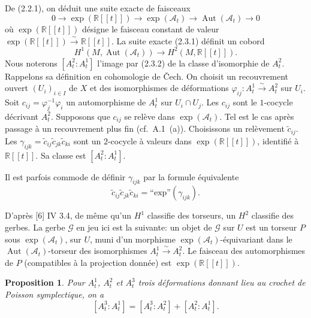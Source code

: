 \documentclass[11pt,a4paper]{article}
\theoremstyle{plain}
\newtheorem{proposition}[theorem]{Proposition}
\theoremstyle{definition}
\DeclareMathOperator{\Aut}{Aut}
\newcommand{\R}{\mathbb{R}}
\newcommand{\iso}{\xrightarrow{\sim}}
\begin{document}
\subsection{}
De (2.2.1), on d\'eduit une suite exacte de faisceaux
\begin{equation}
0 \longrightarrow \exp(\R[[t]]) \longrightarrow \exp(\mathcal{A}_{t}) \longrightarrow \Aut(\mathcal{A}_{t}) \longrightarrow 0 \tag{2.3.1}
\end{equation}
o\`u $\exp(\R[[t]])$ d\'esigne le faisceau constant de valeur $\exp(\R[[t]]) \iso \R[[t]]$. La suite exacte (2.3.1) d\'efinit un cobord
\begin{equation}
H^{1}(M, \Aut(\mathcal{A}_{t})) \longrightarrow H^{2}(M, \R[[t]]). \tag{2.3.2}
\end{equation}
Nous noterons $[A_{t}^{2} : A_{t}^{1}]$ l'image par (2.3.2) de la classe d'isomorphie de $A_{t}^{2}$. Rappelons sa d\'efinition en cohomologie de \v{C}ech. On choisit un recouvrement ouvert $(U_{i})_{i \in I}$ de $X$ et des isomorphismes de d\'eformations $\varphi_{ij}: A_{t}^{1} \iso A_{t}^{2}$ sur $U_{i}$. Soit $c_{ij} = \varphi_{j}^{-1} \varphi_{i}$ un automorphisme de $A_{t}^{1}$ sur $U_{i} \cap U_{j}$. Les $c_{ij}$ sont le $1$-cocycle d\'ecrivant $A_{t}^{2}$. Supposons que $c_{ij}$ se rel\`eve dans $\exp(\mathcal{A}_{t})$. Tel est le cas apr\`es passage \`a un recouvrement plus fin (cf.~A.1~(a)). Choisissons un rel\`evement $\tilde{c}_{ij}$. Les $\gamma_{ijk} = \tilde{c}_{ij} \tilde{c}_{jk} \tilde{c}_{ki}$ sont un $2$-cocycle \`a valeurs dans $\exp(\R[[t]])$, identifi\'e \`a $\R[[t]]$. Sa classe est $[A_{t}^{2} : A_{t}^{1}]$.

Il est parfois commode de d\'efinir $\gamma_{ijk}$ par la formule \'equivalente
\[
\tilde{c}_{ij} \tilde{c}_{jk} \tilde{c}_{ki} = \text{``exp''} (\gamma_{ijk}).
\]

D'apr\`es [6] IV 3.4, de m\^eme qu'un $H^{1}$ classifie des torseurs, un $H^{2}$ classifie des gerbes. La gerbe $\mathcal{G}$ en jeu ici est la suivante: un objet de $\mathcal{G}$ sur $U$ est un torseur $P$ sous $\exp(\mathcal{A}_{t})$, sur $U$, muni d'un morphisme $\exp(\mathcal{A}_{t})$-\'equivariant dans le $\Aut(\mathcal{A}_{t})$-torseur des isomorphismes $A_{t}^{1} \iso A_{t}^{2}$. Le faisceau des automorphismes de $P$ (compatibles \`a la projection donn\'ee) est $\exp(\R[[t]])$.

\begin{proposition}
Pour $A_{t}^{1}$, $A_{t}^{2}$ et $A_{t}^{3}$ trois d\'eformations donnant lieu au crochet de Poisson symplectique, on a
\[
[A_{t}^{3} : A_{t}^{1}] = [A_{t}^{3} : A_{t}^{2}] + [A_{t}^{2} : A_{t}^{1}].
\]
\end{proposition}
\end{document}
